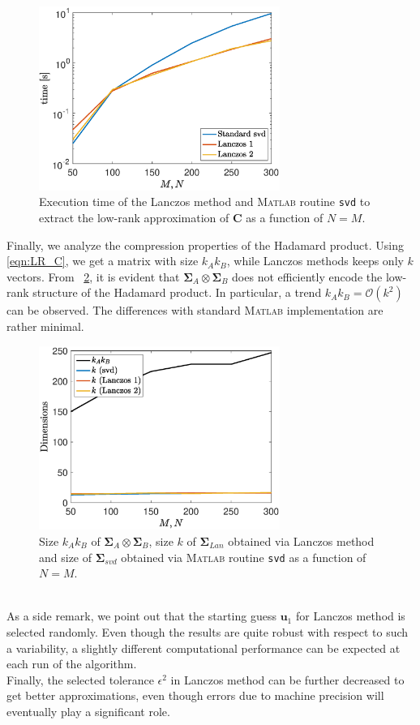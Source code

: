 \documentclass[10pt,titlepage]{article}
\numberwithin{equation}{section}
\numberwithin{figure}{section}
\newcommand{\figref}[1]{\figurename~\ref{#1}}
\begin{document}
\begin{figure}[htbp]
	\centering
	\includegraphics[height=6cm]{./time.eps}
	\caption{Execution time of the Lanczos method and \textsc{Matlab} routine \texttt{svd} to extract the low-rank approximation of $\mathbf{C}$ as a function of $N=M$.}
	\label{fig:time}
\end{figure}%
Finally, we analyze the compression properties of the Hadamard product. Using \eqref{eqn:LR_C}, we get a matrix with size $k_Ak_B$, while Lanczos methods keeps only $k$ vectors. From \figref{fig:dimension}, it is evident that $\mathbf{\Sigma}_A \otimes \mathbf{\Sigma}_B$ does not efficiently encode the low-rank structure of the Hadamard product. In particular, a trend $k_Ak_B=\mathcal{O}(k^2)$ can be observed. The differences with standard \textsc{Matlab} implementation are rather minimal.
\begin{figure}[htbp]
	\centering
	\includegraphics[height=6cm]{./dimension.eps}
	\caption{Size $k_Ak_B$ of $\mathbf{\Sigma}_A \otimes \mathbf{\Sigma}_B$, size $k$ of $\mathbf{\Sigma}_{Lan}$ obtained via Lanczos method and size of $\mathbf{\Sigma}_{svd}$ obtained via \textsc{Matlab} routine \texttt{svd} as a function of $N=M$.}
	\label{fig:dimension}
\end{figure}%
\\
As a side remark, we point out that the starting guess $\mathbf{u}_1$ for Lanczos method is selected randomly. Even though the results are quite robust with respect to such a variability, a slightly different computational performance can be expected at each run of the algorithm. \\
Finally, the selected tolerance $\epsilon^2$ in Lanczos method can be further decreased to get better approximations, even though errors due to machine precision will eventually play a significant role.  
\end{document}
